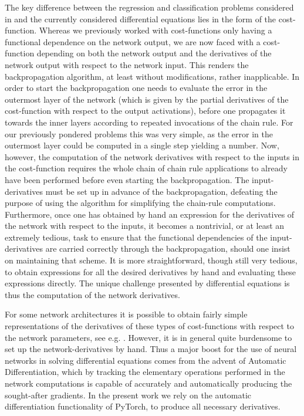 \documentclass[reprint, english, nofootinbib]{revtex4-2}
\begin{document}
The key difference between the regression and classification problems considered in \citep{4155_project_2} and the currently considered differential equations lies in the form of the cost-function. Whereas we previously worked with cost-functions only having a functional dependence on the network output, we are now faced with a cost-function depending on both the network output and the derivatives of the network output with respect to the network input. This renders the backpropagation algorithm, at least without modifications, rather inapplicable. In order to start the backpropagation one needs to evaluate the error in the outermost layer of the network (which is given by the partial derivatives of the cost-function with respect to the output activations), before one propagates it towards the inner layers according to repeated invocations of the chain rule. For our previously pondered problems this was very simple, as the error in the outermost layer could be computed in a single step yielding a number. Now, however, the computation of the network derivatives with respect to the inputs in the cost-function requires the whole chain of chain rule applications to already have been performed before even starting the backpropagation. The input-derivatives must be set up in advance of the backpropagation, defeating the purpose of using the algorithm for simplifying the chain-rule computations. Furthermore, once one has obtained by hand an expression for the derivatives of the network with respect to the inputs, it becomes a nontrivial, or at least an extremely tedious, task to ensure that the functional dependencies of the input-derivatives are carried correctly through the backpropagation, should one insist on maintaining that scheme. It is more straightforward, though still very tedious, to obtain expressions for all the desired derivatives by hand and evaluating these expressions directly. The unique challenge presented by differential equations is thus the computation of the network derivatives.

For some network architectures it is possible to obtain fairly simple representations of the derivatives of these types of cost-functions with respect to the network parameters, see e.g. \cite{Lagaris_1998}. However, it is in general quite burdensome to set up the network-derivatives by hand. Thus a major boost for the use of neural networks in solving differential equations comes from the advent of Automatic Differentiation, which by tracking the elementary operations performed in the network computations is capable of accurately and automatically producing the sought-after gradients. In the present work we rely on the automatic differentiation functionality of PyTorch, to produce all necessary derivatives.
\end{document}
